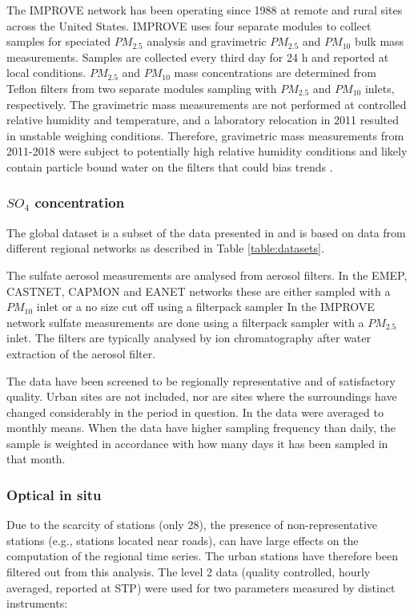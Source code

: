 \documentclass[journal abbreviation, manuscript]{copernicus}
\begin{document}
The IMPROVE network has been operating since 1988 at remote and rural sites across the United States. IMPROVE uses four separate modules to collect samples for speciated $PM_{2.5}$ analysis and gravimetric $PM_{2.5}$ and $PM_{10}$ bulk mass measurements. Samples are collected every third day for 24 h and reported at local conditions. $PM_{2.5}$ and $PM_{10}$ mass concentrations are determined from Teflon filters from two separate modules sampling with $PM_{2.5}$ and $PM_{10}$ inlets, respectively. The gravimetric mass measurements are not performed at controlled relative humidity and temperature, and a laboratory relocation in 2011 resulted in unstable weighing conditions. Therefore, gravimetric mass measurements from 2011-2018 were subject to potentially high relative humidity conditions and likely contain particle bound water on the filters that could bias trends \citep{Hand2019}.



\subsubsection{$SO_{4}$ concentration}
 The global dataset is a subset of the data presented in \cite{aas2019global} and is based on data from different regional networks as described in Table \ref{table:datasets}.

The sulfate aerosol measurements are analysed from aerosol filters. In the EMEP, CASTNET, CAPMON and EANET networks these are either sampled with a $PM_{10}$ inlet or a no size cut off using a filterpack sampler  In the IMPROVE network sulfate measurements are done using a filterpack sampler with a $PM_{2.5}$ inlet. The filters are typically analysed by ion chromatography after water extraction of the aerosol filter.

The data have been screened to be regionally representative and of satisfactory quality. Urban sites are not included, nor are sites where the surroundings have changed considerably in the period in question.
In \cite{aas2019global} the data  were averaged to monthly means.  When the data have higher sampling frequency than daily, the sample is weighted in accordance with how many days it has been sampled in that month.

\subsubsection{Optical in situ}
Due to the scarcity of stations (only 28), the presence of non-representative stations (e.g., stations located near roads), can have large effects on the computation of the regional time series. The urban stations have therefore been filtered out from this analysis. The level 2 data (quality controlled, hourly averaged, reported at STP) were used for two parameters measured by distinct instruments:
\end{document}
